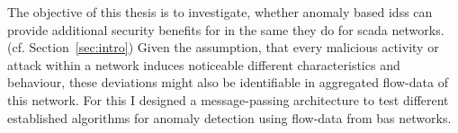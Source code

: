 
\begin{comment}
\begin{itemize}
	\item experiment
	\item test data captured from a floor section of the computer science building
	\item enriched with malicious packets to keep consistent
	
	\item (focusses only an purpose based) attack classes (cf. \parencite{Uma2013})
		\subitem \gls{dos}
			\subsubitem Short circuit -> blackout on entire line
			\subsubitem flooding of \code{A\_Restart} telegrams
			\subsubitem flooding nonsense
		\subitem replay
			\subsubitem repeating a time window
			\subsubitem sniff a tag and repeat it compressed??? \alert{whatever this means?}
			\subsubitem do inverse action
		\subitem manipulation/reconfiguration
			\subsubitem telegram manipulation
			\subsubitem reconfiguration of devices (Access Attack)
			\subsubitem reconfigure line couplers/make them useless (Access Attack)
		\subitem spoofing 
		\subitem Reconnaissance Attack
			\subsubitem network mapping
			
		\subitem 
	
	\item aim is to show if attacks can be identified by anomaly detection on flow data
		\subitem under the assumption, that attacks noticeable alter the characteristic and behaviour of \gls{knx} traffic
		\subitem cf. \parencite{Mukherjee1994,Yang2006,Pan2014}
	\item demonstrate a message-passing architecture to perform online analytics on \gls{knx} flow-data
	\item benchmark different algorithms against each other
\end{itemize}
\end{comment}

The objective of this thesis is to investigate, whether anomaly based \glspl{ids} can provide additional security benefits for  in the same they do for \gls{scada} networks. (cf. Section~\ref{sec:intro})
Given the assumption, that every malicious activity or attack within a network induces noticeable different characteristics and behaviour, these deviations might also be identifiable in aggregated flow-data of this network. \parencite[cf.][]{Mukherjee1994,Yang2006,Pan2014}
For this I designed a message-passing architecture to test different established algorithms for anomaly detection using flow-data from \gls{bas} networks.

